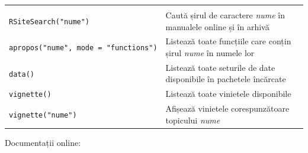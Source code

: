 \documentclass[]{article}
\begin{document}
\begin{longtable}[]{@{}ll@{}}
\begin{minipage}[t]{0.34\columnwidth}
\end{minipage}\tabularnewline
\begin{minipage}[t]{0.27\columnwidth}\raggedright\strut
\texttt{RSiteSearch("nume")}\strut
\end{minipage} & \begin{minipage}[t]{0.34\columnwidth}\raggedright\strut
Caută șirul de caractere \emph{nume} în manualele online și în
arhivă\strut
\end{minipage}\tabularnewline
\begin{minipage}[t]{0.27\columnwidth}\raggedright\strut
\texttt{apropos("nume",\ mode\ =\ "functions")}\strut
\end{minipage} & \begin{minipage}[t]{0.34\columnwidth}\raggedright\strut
Listează toate funcțiile care conțin șirul \emph{nume} în numele
lor\strut
\end{minipage}\tabularnewline
\begin{minipage}[t]{0.27\columnwidth}\raggedright\strut
\texttt{data()}\strut
\end{minipage} & \begin{minipage}[t]{0.34\columnwidth}\raggedright\strut
Listează toate seturile de date disponibile în pachetele încărcate\strut
\end{minipage}\tabularnewline
\begin{minipage}[t]{0.27\columnwidth}\raggedright\strut
\texttt{vignette()}\strut
\end{minipage} & \begin{minipage}[t]{0.34\columnwidth}\raggedright\strut
Listează toate vinietele disponibile\strut
\end{minipage}\tabularnewline
\begin{minipage}[t]{0.27\columnwidth}\raggedright\strut
\texttt{vignette("nume")}\strut
\end{minipage} & \begin{minipage}[t]{0.34\columnwidth}\raggedright\strut
Afișează vinietele corespunzătoare topicului \emph{nume}\strut
\end{minipage}\tabularnewline
\bottomrule
\end{longtable}

Documentații online:
\end{document}
